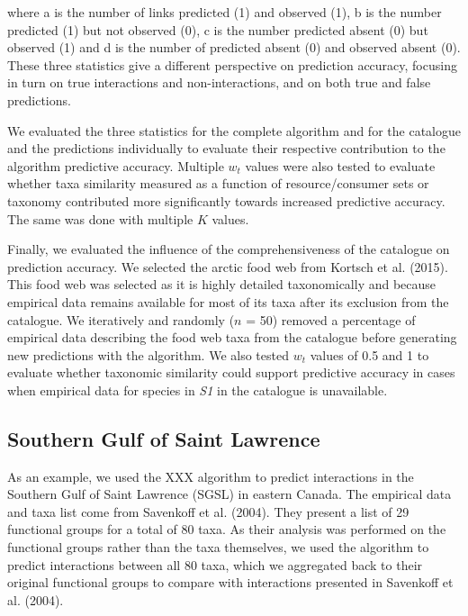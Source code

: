 \documentclass[letterpaper]{article}
\begin{document}
where a is the number of links predicted (1) and observed (1), b is the number predicted (1) but not observed (0), c is the number predicted absent (0) but observed (1) and d is the number of predicted absent (0) and observed absent (0). These three statistics give a different perspective on prediction accuracy, focusing in turn on true interactions and non-interactions, and on both true and false predictions.

We evaluated the three statistics for the complete algorithm and for the catalogue and the predictions individually to evaluate their respective contribution to the algorithm predictive accuracy. Multiple $w_t$ values were also tested to evaluate whether taxa similarity measured as a function of resource/consumer sets or taxonomy contributed more significantly towards increased predictive accuracy. The same was done with multiple $K$ values.

Finally, we evaluated the influence of the comprehensiveness of the catalogue on prediction accuracy. We selected the arctic food web from Kortsch et al. (2015). This food web was selected as it is highly detailed taxonomically and because empirical data remains available for most of its taxa after its exclusion from the catalogue. We iteratively and randomly ($n$ = 50) removed a percentage of empirical data describing the food web taxa from the catalogue before generating new predictions with the algorithm. We also tested $w_t$ values of 0.5 and 1 to evaluate whether taxonomic similarity could support predictive accuracy in cases when empirical data for species in \textit{S1} in the catalogue is unavailable.

\subsection{Southern Gulf of Saint Lawrence}
    As an example, we used the XXX algorithm to predict interactions in the Southern Gulf of Saint Lawrence (SGSL) in eastern Canada. The empirical data and taxa list come from Savenkoff et al. (2004). They present a list of 29 functional groups for a total of 80 taxa. As their analysis was performed on the functional groups rather than the taxa themselves, we used the algorithm to predict interactions between all 80 taxa, which we aggregated back to their original functional groups to compare with interactions presented in Savenkoff et al. (2004).

\end{document}
